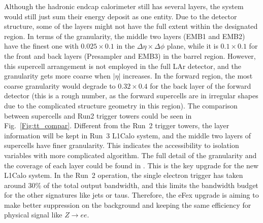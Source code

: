 Although the hadronic endcap calorimeter still has several layers, the system would still just sum their energy deposit as one entity. Due to the detector structure, some of the layers might not have the full extent within the designated region. In terms of the granularity, the middle two layers (EMB1 and EMB2) have the finest one with $0.025\times 0.1$ in the $\Delta\eta\times\Delta\phi$ plane, while it is $0.1\times0.1$ for the front and back layers (Presampler and EMB3) in the barrel region. However, this supercell arrangement is not employed in the full LAr detector, and the granularity gets more coarse when $|\eta|$ increases. In the forward region, the most coarse granularity would degrade to $0.32\times0.4$ for the back layer of the forward detector (this is a rough number, as the forward supercells are in irregular shapes due to the complicated structure geometry in this region). The comparison between supercells and Run2 trigger towers could be seen in Fig.~\ref{Fig:tt_compar}. Different from the Run~2 trigger towers, the layer information will be kept in Run~3 L1Calo system, and the middle two layers of supercells have finer granularity. This indicates the accessibility to isolation variables with more complicated algorithm. The full detail of the granularity and the coverage of each layer could be found in \cite{Aleksa:1602230}. This is the key upgrade for the new L1Calo system. In the Run~2 operation, the single electron trigger has taken around $30\%$ of the total output bandwidth, and this limits the bandwidth budget for the other signatures like jets or taus. Therefore, the eFex upgrade is aiming to make better suppression on the background and keeping the same efficiency for physical signal like $Z\to ee$. 
